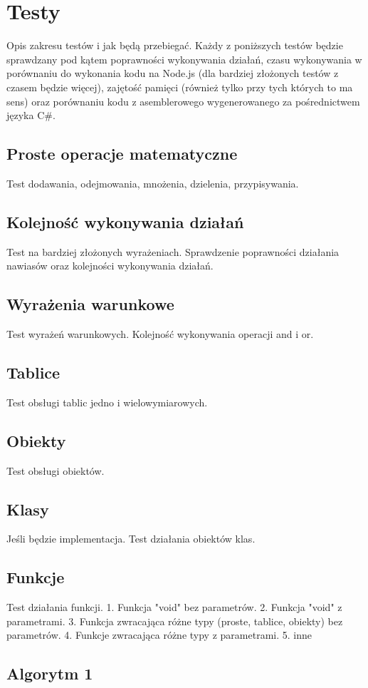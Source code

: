 \documentclass[a4paper]{article}
\begin{document}
\section{Testy}
Opis zakresu testów i jak będą przebiegać.
Każdy z poniższych testów będzie sprawdzany pod kątem poprawności wykonywania działań, czasu wykonywania w porównaniu do wykonania kodu na Node.js (dla bardziej złożonych testów z czasem będzie więcej), zajętość pamięci (również tylko przy tych których to ma sens) oraz porównaniu kodu z asemblerowego wygenerowanego za pośrednictwem języka C\#.

\subsection{Proste operacje matematyczne}
Test dodawania, odejmowania, mnożenia, dzielenia, przypisywania.
\subsection{Kolejność wykonywania działań}
Test na bardziej złożonych wyrażeniach. Sprawdzenie poprawności działania nawiasów oraz kolejności wykonywania działań.
\subsection{Wyrażenia warunkowe}
Test wyrażeń warunkowych. Kolejność wykonywania operacji and i or.
\subsection{Tablice}
Test obsługi tablic jedno i wielowymiarowych.
\subsection{Obiekty}
Test obsługi obiektów.
\subsection{Klasy}
Jeśli będzie implementacja.
Test działania obiektów klas.
\subsection{Funkcje}
Test działania funkcji.
1. Funkcja "void" bez parametrów.
2. Funkcja "void" z parametrami.
3. Funkcja zwracająca różne typy (proste, tablice, obiekty) bez parametrów.
4. Funkcje zwracająca różne typy z parametrami.
5. inne

\subsection{Algorytm 1}
\end{document}
